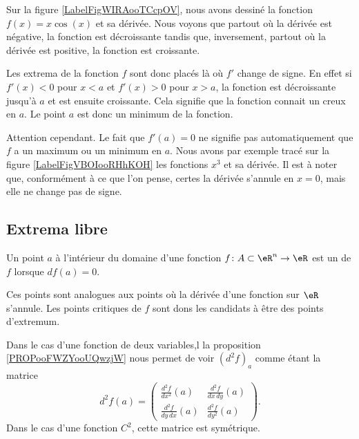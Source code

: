 Sur la figure \ref{LabelFigWIRAooTCcpOV}, nous avons dessiné la fonction $f(x)=x\cos(x)$ et sa dérivée. Nous voyons que partout où la dérivée est négative, la fonction est décroissante tandis que, inversement, partout où la dérivée est positive, la fonction est croissante.
\newcommand{\CaptionFigWIRAooTCcpOV}{La fonction $f(x)=x\cos(x)$ en bleu et sa dérivée en rouge.}


Les extrema de la fonction $f$ sont donc placés là où $f'$ change de signe. En effet si $f'(x)<0$ pour $x<a$ et $f'(x)>0$ pour $x>a$, la fonction est décroissante jusqu'à $a$ et est ensuite croissante. Cela signifie que la fonction connait un creux en $a$. Le point $a$ est donc un minimum de la fonction.

Attention cependant. Le fait que $f'(a)=0$ ne signifie pas automatiquement que $f$ a un maximum ou un minimum en $a$. Nous avons par exemple tracé sur la figure \ref{LabelFigVBOIooRHhKOH} les fonctions $x^3$ et sa dérivée. Il est à noter que, conformément à ce que l'on pense, certes la dérivée s'annule en $x=0$, mais elle ne change pas de signe.

\newcommand{\CaptionFigVBOIooRHhKOH}{La dérivée de $x^3$ s'annule en $x=0$, mais ce n'est ni un minimum ni un maximum.}

 
\subsection{Extrema libre}

\begin{definition}      \label{DEFooYJLZooLkEAYf}
Un point $a$ à l'intérieur du domaine d'une fonction $f\colon A\subset\eR^n\to \eR$ est un  de $f$ lorsque $df(a)=0$. 
\end{definition}

Ces points sont analogues aux points où la dérivée d'une fonction sur $\eR$ s'annule. Les points critiques de $f$ sont dons les candidats à être des points d'extremum.

Dans le cas d'une fonction de deux variables,l la proposition \ref{PROPooFWZYooUQwzjW} nous permet de voir \( (d^2f)_a\) comme étant la matrice 
\begin{equation}
    d^2f(a)=\begin{pmatrix}
    \frac{ d^2f  }{ dx^2 }(a)   &   \frac{ d^2f  }{ dx\,dy }(a) \\ 
    \frac{ d^2f  }{ dy\,dx }(a)     &   \frac{ d^2f  }{ dy^2 }(a)
\end{pmatrix}.
\end{equation}
Dans le cas d'une fonction $C^2$, cette matrice est symétrique.

